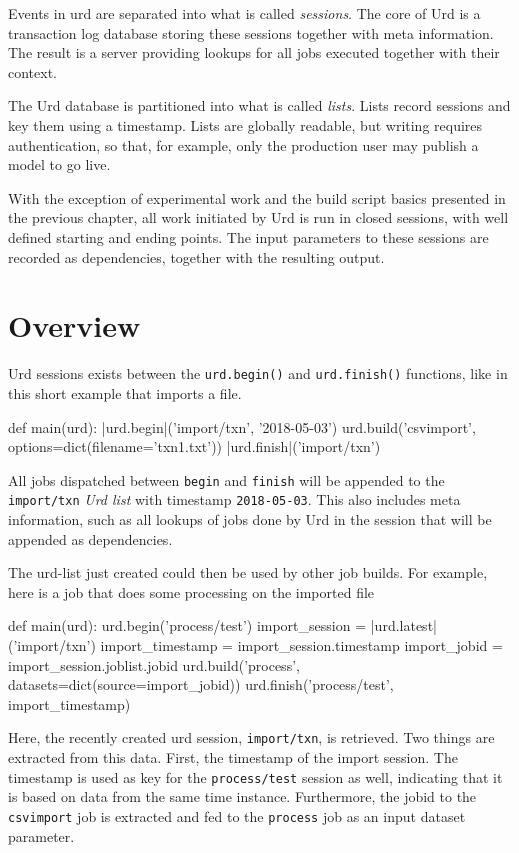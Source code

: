 Events in urd are separated into what is called \textsl{sessions}.
The core of Urd is a transaction log database storing these sessions
together with meta information.  The result is a server providing
lookups for all jobs executed together with their context.

The Urd database is partitioned into what is called \textsl{lists}.
Lists record sessions and key them using a timestamp.  Lists are
globally readable, but writing requires authentication, so that, for
example, only the production user may publish a model to go live.

With the exception of experimental work and the build script basics
presented in the previous chapter, all work initiated by Urd is run in
closed sessions, with well defined starting and ending points.  The
input parameters to these sessions are recorded as dependencies,
together with the resulting output.



\section{Overview}

Urd sessions exists between the \texttt{urd.begin()}
and \texttt{urd.finish()} functions, like in this short example that
imports a file.

\begin{python}
def main(urd):
    |\colorbox{hl}{urd.begin}|('import/txn', '2018-05-03')
    urd.build('csvimport', options=dict(filename='txn1.txt'))
    |\colorbox{hl}{urd.finish}|('import/txn')
\end{python}

All jobs dispatched between \texttt{begin} and \texttt{finish} will be
appended to the \texttt{import/txn} \textsl{Urd list} with
timestamp \texttt{2018-05-03}.  This also includes meta information,
such as all lookups of jobs done by Urd in the session that will be
appended as dependencies.

The urd-list just created could then be used by other job builds.  For
example, here is a job that does some processing on the imported file
\begin{python}
def main(urd):
    urd.begin('process/test')
        import_session = |\colorbox{hl}{urd.latest}|('import/txn')
        import_timestamp = import_session.timestamp
        import_jobid = import_session.joblist.jobid
        urd.build('process', datasets=dict(source=import_jobid))
    urd.finish('process/test', import_timestamp)
\end{python}
Here, the recently created urd session, \texttt{import/txn}, is
retrieved.  Two things are extracted from this data.  First, the
timestamp of the import session.  The timestamp is used as key for
the \texttt{process/test} session as well, indicating that it is based
on data from the same time instance.  Furthermore, the jobid to
the \texttt{csvimport} job is extracted and fed to
the \texttt{process} job as an input dataset parameter.



